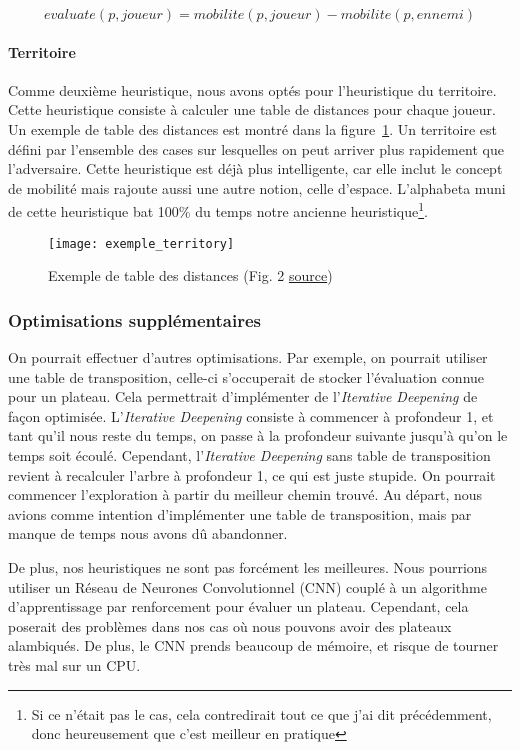 \begin{equation}
	evaluate(p, joueur) = mobilite(p, joueur) - mobilite(p, ennemi)
	\label{eq:mobility-heuristic}
\end{equation}

\paragraph{Territoire}
Comme deuxième heuristique, nous avons optés pour l'heuristique du territoire.
Cette heuristique consiste à calculer une table de distances pour chaque joueur.
Un exemple de table des distances est montré dans la figure~\ref{fig:exemple-territoire}.
Un territoire est défini par l'ensemble des cases sur lesquelles on peut arriver plus rapidement
que l'adversaire. Cette heuristique est déjà plus intelligente, car elle inclut le concept de mobilité mais
rajoute aussi une autre notion, celle d'espace. L'alphabeta muni de cette heuristique bat
100\% du temps notre ancienne heuristique\footnote{Si ce n'était pas le cas, cela contredirait tout ce que j'ai dit précédemment, donc heureusement que c'est meilleur en pratique}.

\begin{figure}[H]
	\centering
	\texttt{[image: exemple\_territory]}
	\caption{Exemple de table des distances (Fig. 2 \href{https://core.ac.uk/download/pdf/81108035.pdf}{source})}
	\label{fig:exemple-territoire}
\end{figure}
\subsubsection{Optimisations supplémentaires}
On pourrait effectuer d'autres optimisations. Par exemple, on pourrait utiliser
une table de transposition, celle-ci s'occuperait de stocker l'évaluation connue pour un plateau.
Cela permettrait d'implémenter de l'\textit{Iterative Deepening} de façon optimisée. L'\textit{Iterative Deepening} consiste
à commencer à profondeur 1, et tant qu'il nous reste du temps, on passe à la profondeur suivante jusqu'à qu'on le temps soit écoulé.
Cependant, l'\textit{Iterative Deepening} sans table de transposition revient à recalculer l'arbre à profondeur 1, ce qui est juste stupide. On pourrait
commencer l'exploration à partir du meilleur chemin trouvé. Au départ, nous avions comme intention
d'implémenter une table de transposition, mais par manque de temps nous avons dû abandonner.

De plus, nos heuristiques ne sont pas forcément les meilleures. Nous pourrions
utiliser un Réseau de Neurones Convolutionnel (CNN) couplé à un algorithme
d'apprentissage par renforcement pour évaluer un plateau. Cependant, cela poserait des problèmes
dans nos cas où nous pouvons avoir des plateaux alambiqués. De plus, le CNN prends
beaucoup de mémoire, et risque de tourner très mal sur un CPU.

